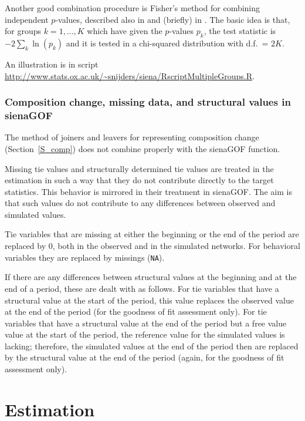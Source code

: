 \documentclass[a4paper,fleqn,11pt]{article}
\newcommand{\+}{\, + \,}
\newcommand{\sfn}[1]{\textsf{#1}}
\begin{document}
Another good combination procedure is
Fisher's method for combining independent $p$-values, described also in
\citet{HedgesOlkin85} and (briefly) in \citet[Chapter 3]{SnijdersBosker12}.
The basic idea is that, for groups $k = 1, \ldots, K$
which have given the $p$-values $p_k$, the test statistic is
$- 2 \sum_k \ln(p_k)$ and it is tested in a chi-squared distribution
with d.f.\ = $2K$.

An illustration is in script \\
\url{http://www.stats.ox.ac.uk/~snijders/siena/RscriptMultipleGroups.R}.



\subsubsection{Composition change, missing data, and structural values in \sfn{sienaGOF} }


The method of joiners and leavers for representing composition change
(Section~\ref{S_comp}) does not combine properly with the \sfn{sienaGOF} function.


Missing tie values and structurally determined tie values are treated
in the estimation in such a way that they do not contribute directly
to the target statistics. This behavior is mirrored in their treatment
in \sfn{sienaGOF}. The aim is that such values do not contribute
to any differences between observed and simulated values.

Tie variables that are missing at either the beginning or the end of the period
are replaced by 0, both in the observed and in the simulated networks.
For behavioral variables they are replaced by missings (\texttt{NA}).

If there are any differences between structural values at the beginning and
at the end of a period, these are dealt with as follows.
For tie variables that have a structural value at the start of the period,
this value replaces the observed value at the end of the period
(for the goodness of fit assessment only).
For tie variables that have a structural value at the end of the period
but a free value value at the start of the period, the reference value for
the simulated values is lacking; therefore, the simulated values at the end
of the period then are replaced by the structural value at the end of the period
(again, for the goodness of fit assessment only).


\newpage

\section{Estimation}
\label{S_Est}
\end{document}
